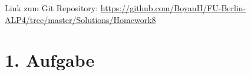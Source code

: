 \usepackage{graphicx}
\usepackage{amsmath}
\usepackage{amssymb}
\usepackage{fancyvrb}

\newcommand{\dozent}{Prof. Dr. Margarita Esponda}					%
\newcommand{\tutor}{Lilli Walter}						%
\newcommand{\tutoriumNo}{6}				%
\newcommand{\projectNo}{8}									%
\newcommand{\veranstaltung}{Nichtsequentielle Programmierung}	%
\newcommand{\semester}{SoeSe 2017}						%
\newcommand{\studenten}{Boyan Hristov, Sergelen Gongor}			%





Link zum Git Repository: \url{https://github.com/BoyanH/FU-Berlin-ALP4/tree/master/Solutions/Homework\projectNo}


\section*{1. Aufgabe}

